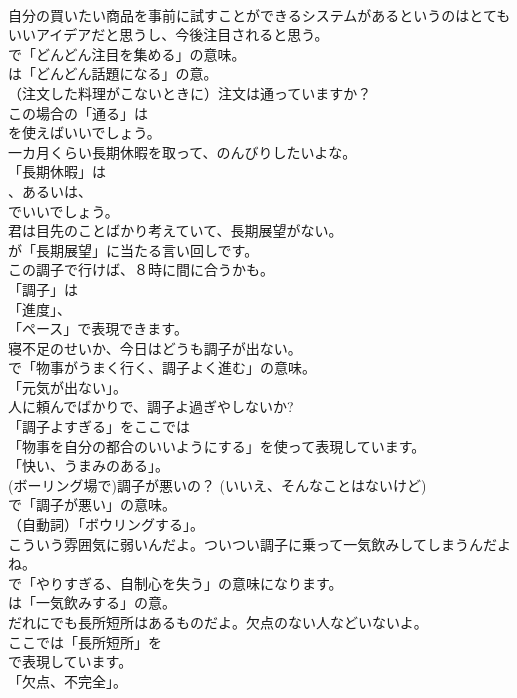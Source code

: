 \documentclass[8pt]{extreport}
\begin{document}
\begin{CJK}{UTF8}{min}
\\	自分の買いたい商品を事前に試すことができるシステムがあるというのはとてもいいアイデアだと思うし、今後注目されると思う。 
\\	で「どんどん注目を集める」の意味。
\\	は「どんどん話題になる」の意。	
\\	（注文した料理がこないときに）注文は通っていますか？ 
\\	この場合の「通る」は
\\	を使えばいいでしょう。	
\\	一カ月くらい長期休暇を取って、のんびりしたいよな。 
\\	「長期休暇」は 
\\	、あるいは、
\\	でいいでしょう。	
\\	君は目先のことばかり考えていて、長期展望がない。 
\\	が「長期展望」に当たる言い回しです。	
\\	この調子で行けば、８時に間に合うかも。 
\\	「調子」は
\\	「進度」、
\\	「ペース」で表現できます。	
\\	寝不足のせいか、今日はどうも調子が出ない。 
\\	で「物事がうまく行く、調子よく進む」の意味。
\\	「元気が出ない」。	
\\	人に頼んでばかりで、調子よ過ぎやしないか? 
\\	「調子よすぎる」をここでは
\\	「物事を自分の都合のいいようにする」を使って表現しています。
\\	「快い、うまみのある」。	
\\	(ボーリング場で)調子が悪いの？ (いいえ、そんなことはないけど) 
\\	で「調子が悪い」の意味。
\\	（自動詞）「ボウリングする」。	
\\	こういう雰囲気に弱いんだよ。ついつい調子に乗って一気飲みしてしまうんだよね。 
\\	で「やりすぎる、自制心を失う」の意味になります。
\\	は「一気飲みする」の意。	
\\	だれにでも長所短所はあるものだよ。欠点のない人などいないよ。 
\\	ここでは「長所短所」を
\\	で表現しています。
\\	「欠点、不完全」。	

\end{CJK}
\end{document}
